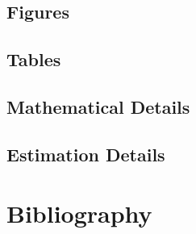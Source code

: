 \documentclass[11pt]{report}
\begin{document}
\clearpage
\begin{subappendices}
\section{Figures}\label{app:dsc-figures}


\clearpage
\section{Tables}\label{app:dsc-tables}


\clearpage
\section{Mathematical Details}\label{app:dsc-math}


\clearpage
\section{Estimation Details}\label{app:dsc-estimation-details}


\end{subappendices}


% 

%
%
%
%
%
%
\clearpage
\chapter*{Bibliography}

\begin{singlespace}

  \setlength{}

  \raggedright
  \printbibliography[
    heading = none
  ]
\end{singlespace}
\end{document}
